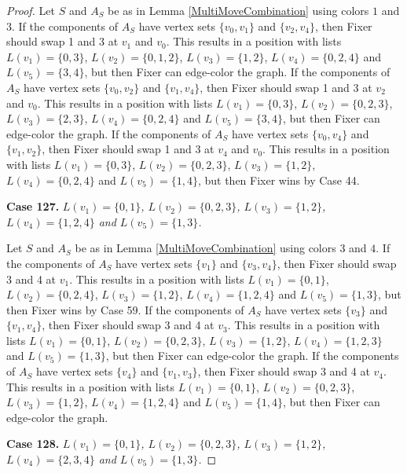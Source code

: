 \documentclass[12pt]{amsart}
\theoremstyle{plain}
\theoremstyle{definition}
\theoremstyle{remark}
\begin{document}
\begin{proof}
Let $S$ and $A_S$ be as in Lemma \ref{MultiMoveCombination} using colors $1$ and $3$. If the components of $A_S$ have vertex sets $\{v_0, v_1\}$ and $\{v_2, v_4\}$, then Fixer should swap 1 and 3 at $v_1$ and $v_0$. This results in a position with lists $L(v_1) = \{0, 3\}$, $L(v_2) = \{0, 1, 2\}$, $L(v_3) = \{1, 2\}$, $L(v_4) = \{0, 2, 4\}$ and $L(v_5) = \{3, 4\}$, but then Fixer can edge-color the graph.
If the components of $A_S$ have vertex sets $\{v_0, v_2\}$ and $\{v_1, v_4\}$, then Fixer should swap 1 and 3 at $v_2$ and $v_0$. This results in a position with lists $L(v_1) = \{0, 3\}$, $L(v_2) = \{0, 2, 3\}$, $L(v_3) = \{2, 3\}$, $L(v_4) = \{0, 2, 4\}$ and $L(v_5) = \{3, 4\}$, but then Fixer can edge-color the graph.
If the components of $A_S$ have vertex sets $\{v_0, v_4\}$ and $\{v_1, v_2\}$, then Fixer should swap 1 and 3 at $v_4$ and $v_0$. This results in a position with lists $L(v_1) = \{0, 3\}$, $L(v_2) = \{0, 2, 3\}$, $L(v_3) = \{1, 2\}$, $L(v_4) = \{0, 2, 4\}$ and $L(v_5) = \{1, 4\}$, but then Fixer wins by Case 44.

\noindent\textbf{Case 127.  }\textit{$L(v_1) = \{0, 1\}$, $L(v_2) = \{0, 2, 3\}$, $L(v_3) = \{1, 2\}$, $L(v_4) = \{1, 2, 4\}$ and $L(v_5) = \{1, 3\}$.}

Let $S$ and $A_S$ be as in Lemma \ref{MultiMoveCombination} using colors $3$ and $4$. If the components of $A_S$ have vertex sets $\{v_1\}$ and $\{v_3, v_4\}$, then Fixer should swap 3 and 4 at $v_1$. This results in a position with lists $L(v_1) = \{0, 1\}$, $L(v_2) = \{0, 2, 4\}$, $L(v_3) = \{1, 2\}$, $L(v_4) = \{1, 2, 4\}$ and $L(v_5) = \{1, 3\}$, but then Fixer wins by Case 59.
If the components of $A_S$ have vertex sets $\{v_3\}$ and $\{v_1, v_4\}$, then Fixer should swap 3 and 4 at $v_3$. This results in a position with lists $L(v_1) = \{0, 1\}$, $L(v_2) = \{0, 2, 3\}$, $L(v_3) = \{1, 2\}$, $L(v_4) = \{1, 2, 3\}$ and $L(v_5) = \{1, 3\}$, but then Fixer can edge-color the graph.
If the components of $A_S$ have vertex sets $\{v_4\}$ and $\{v_1, v_3\}$, then Fixer should swap 3 and 4 at $v_4$. This results in a position with lists $L(v_1) = \{0, 1\}$, $L(v_2) = \{0, 2, 3\}$, $L(v_3) = \{1, 2\}$, $L(v_4) = \{1, 2, 4\}$ and $L(v_5) = \{1, 4\}$, but then Fixer can edge-color the graph.

\noindent\textbf{Case 128.  }\textit{$L(v_1) = \{0, 1\}$, $L(v_2) = \{0, 2, 3\}$, $L(v_3) = \{1, 2\}$, $L(v_4) = \{2, 3, 4\}$ and $L(v_5) = \{1, 3\}$.}


\end{proof}
\end{document}
